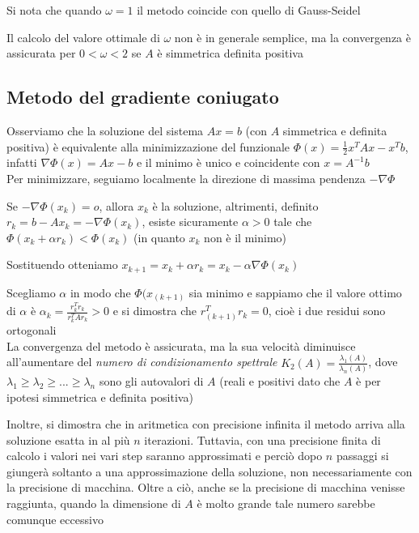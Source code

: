 \documentclass[openany]{book}
\begin{document}
Si nota che quando $\omega=1$ il metodo coincide con quello di Gauss-Seidel

Il calcolo del valore ottimale di $\omega$ non è in generale semplice, ma la convergenza è assicurata per 
$0<\omega<2$ se $A$ è simmetrica definita positiva
\subsection{Metodo del gradiente coniugato}

Osserviamo che la soluzione del sistema $Ax=b$ (con $A$ simmetrica e definita positiva) è equivalente alla 
minimizzazione del funzionale $\Phi(x)=\frac{1}{2}x^TAx-x^Tb$, infatti $\nabla\Phi(x)=Ax-b$ e il minimo è 
unico e coincidente con $x=A^{-1}b$
\\

Per minimizzare, seguiamo localmente la direzione di massima pendenza $-\nabla\Phi$

Se $-\nabla\Phi(x_k)=o$, allora $x_k$ è la soluzione, altrimenti, definito $r_k=b-Ax_k=-\nabla\Phi(x_k)$, 
esiste sicuramente $\alpha>0$ tale che $\Phi(x_k+\alpha r_k)<\Phi(x_k)$ (in quanto $x_k$ non è il minimo)

Sostituendo otteniamo $x_{k+1}=x_k+\alpha r_k=x_k-\alpha\nabla\Phi(x_k)$

Scegliamo $\alpha$ in modo che $\Phi(x_{(k+1)}$ sia minimo e sappiamo che il valore ottimo di $\alpha$ è 
$\alpha_k =\frac{r_k^Tr_k}{r_k^TAr_k}>0$ e si dimostra che $r^T_{(k+1)}r_k=0$, cioè i due residui sono 
ortogonali
\\

La convergenza del metodo è assicurata, ma la sua velocità diminuisce all'aumentare del \textit{numero di 
condizionamento spettrale} $K_2(A)=\frac{\lambda_1(A)}{\lambda_n(A)}$, dove 
$\lambda_1\geq\lambda_2\geq...\geq\lambda_n$ sono gli autovalori di $A$ (reali e positivi dato che $A$ è per 
ipotesi simmetrica e definita positiva)

Inoltre, si dimostra che in aritmetica con precisione infinita il metodo arriva alla soluzione esatta in al 
più $n$ iterazioni. Tuttavia, con una precisione finita di calcolo i valori nei vari step saranno approssimati 
e perciò dopo $n$ passaggi si giungerà soltanto a una approssimazione della soluzione, non necessariamente 
con la precisione di macchina. Oltre a ciò, anche se la precisione di macchina venisse raggiunta, quando la 
dimensione di $A$ è molto grande tale numero sarebbe comunque eccessivo
\end{document}
